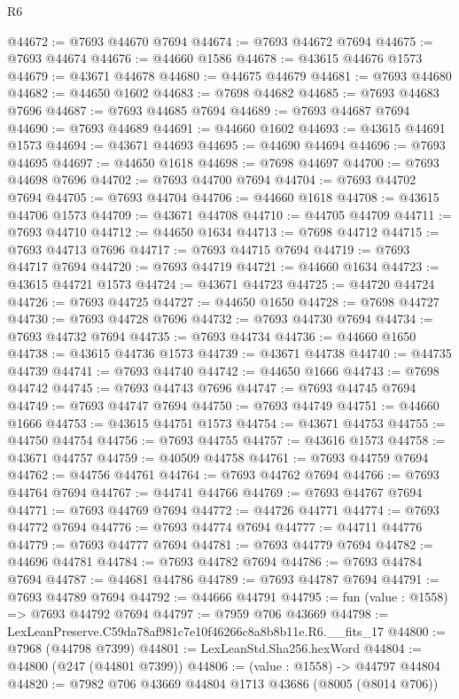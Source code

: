 \begin{lexlean}{R6}
\begin{coremodule}
@44672 := @7693 @44670 @7694
@44674 := @7693 @44672 @7694
@44675 := @7693 @44674
@44676 := @44660 @1586
@44678 := @43615 @44676 @1573
@44679 := @43671 @44678
@44680 := @44675 @44679
@44681 := @7693 @44680
@44682 := @44650 @1602
@44683 := @7698 @44682
@44685 := @7693 @44683 @7696
@44687 := @7693 @44685 @7694
@44689 := @7693 @44687 @7694
@44690 := @7693 @44689
@44691 := @44660 @1602
@44693 := @43615 @44691 @1573
@44694 := @43671 @44693
@44695 := @44690 @44694
@44696 := @7693 @44695
@44697 := @44650 @1618
@44698 := @7698 @44697
@44700 := @7693 @44698 @7696
@44702 := @7693 @44700 @7694
@44704 := @7693 @44702 @7694
@44705 := @7693 @44704
@44706 := @44660 @1618
@44708 := @43615 @44706 @1573
@44709 := @43671 @44708
@44710 := @44705 @44709
@44711 := @7693 @44710
@44712 := @44650 @1634
@44713 := @7698 @44712
@44715 := @7693 @44713 @7696
@44717 := @7693 @44715 @7694
@44719 := @7693 @44717 @7694
@44720 := @7693 @44719
@44721 := @44660 @1634
@44723 := @43615 @44721 @1573
@44724 := @43671 @44723
@44725 := @44720 @44724
@44726 := @7693 @44725
@44727 := @44650 @1650
@44728 := @7698 @44727
@44730 := @7693 @44728 @7696
@44732 := @7693 @44730 @7694
@44734 := @7693 @44732 @7694
@44735 := @7693 @44734
@44736 := @44660 @1650
@44738 := @43615 @44736 @1573
@44739 := @43671 @44738
@44740 := @44735 @44739
@44741 := @7693 @44740
@44742 := @44650 @1666
@44743 := @7698 @44742
@44745 := @7693 @44743 @7696
@44747 := @7693 @44745 @7694
@44749 := @7693 @44747 @7694
@44750 := @7693 @44749
@44751 := @44660 @1666
@44753 := @43615 @44751 @1573
@44754 := @43671 @44753
@44755 := @44750 @44754
@44756 := @7693 @44755
@44757 := @43616 @1573
@44758 := @43671 @44757
@44759 := @40509 @44758
@44761 := @7693 @44759 @7694
@44762 := @44756 @44761
@44764 := @7693 @44762 @7694
@44766 := @7693 @44764 @7694
@44767 := @44741 @44766
@44769 := @7693 @44767 @7694
@44771 := @7693 @44769 @7694
@44772 := @44726 @44771
@44774 := @7693 @44772 @7694
@44776 := @7693 @44774 @7694
@44777 := @44711 @44776
@44779 := @7693 @44777 @7694
@44781 := @7693 @44779 @7694
@44782 := @44696 @44781
@44784 := @7693 @44782 @7694
@44786 := @7693 @44784 @7694
@44787 := @44681 @44786
@44789 := @7693 @44787 @7694
@44791 := @7693 @44789 @7694
@44792 := @44666 @44791
@44795 := fun (value : @1558) => @7693 @44792 @7694
@44797 := @7959 @706 @43669
@44798 := LexLeanPreserve.C59da78af981c7e10f46266c8a8b8b11e.R6.__fits_17
@44800 := @7968 (@44798 @7399)
@44801 := LexLeanStd.Sha256.hexWord
@44804 := @44800 (@247 (@44801 @7399))
@44806 := (value : @1558) -> @44797 @44804
@44820 := @7982
    @706
    @43669
    @44804
    @1713
    @43686
    (@8005 (@8014 @706))

\end{coremodule}
\end{lexlean}
